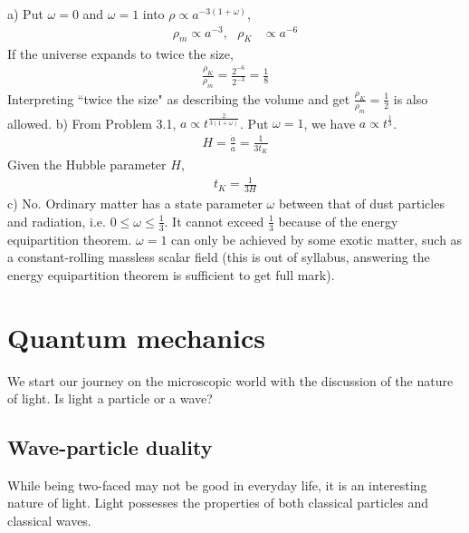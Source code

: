 \documentclass[12pt]{book} %
\numberwithin{equation}{chapter}
\def\w{\omega}
\begin{document}
\begin{solbox}
a) Put $\w=0$ and $\w=1$ into $\rho\propto a^{-3(1+\w)}$, 
\begin{align*}
\rho_{m}\propto a^{-3}, \text{ }\rho_{K}&\propto a^{-6}
\end{align*}
If the universe expands to twice the size,
\begin{align*}
\frac{\rho_{K}}{\rho_{m}}=\frac{2^{-6}}{2^{-3}}=\frac{1}{8}
\end{align*}
Interpreting ``twice the size" as describing the volume and get $\frac{\rho_{K}}{\rho_{m}}=\frac{1}{2}$ is also allowed.\bigskip\newline
b) From Problem 3.1, $a\propto t^{\frac{2}{3(1+\w)}}$. Put $\w=1$, we have $a\propto t^{\frac{1}{3}}$.
\begin{align*}
H=\frac{\dot{a}}{a}=\frac{1}{3t_{K}}
\end{align*}
Given the Hubble parameter $H$,
\begin{align*}
t_{K}=\frac{1}{3H}
\end{align*}
c) No. Ordinary matter has a state parameter $\w$ between that of dust particles and radiation, i.e. $0\leq \w \leq \frac{1}{3}$. It cannot exceed $\frac{1}{3}$ because of the energy equipartition theorem.\bigskip\newline
$\w=1$ can only be achieved by some exotic matter, such as a constant-rolling massless scalar field (this is out of syllabus, answering the energy equipartition theorem is sufficient to get full mark).
\end{solbox}

\newpage
{} %
\chapter{Quantum mechanics}
We start our journey on the microscopic world with the discussion of the nature of light. Is light a particle or a wave?

\section{Wave-particle duality}
While being two-faced may not be good in everyday life, it is an interesting nature of light. Light possesses the properties of both classical particles and classical waves.
\end{document}
